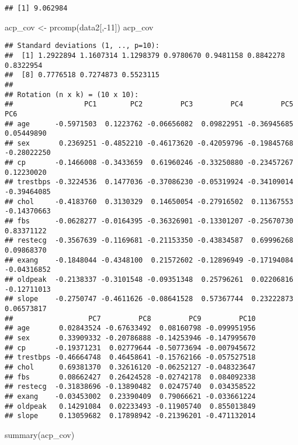 \documentclass[
]{article}
\newenvironment{Shaded}{\begin{snugshade}}{\end{snugshade}}
\newcommand{\DecValTok}[1]{\textcolor[rgb]{0.00,0.00,0.81}{#1}}
\newcommand{\FunctionTok}[1]{\textcolor[rgb]{0.00,0.00,0.00}{#1}}
\newcommand{\NormalTok}[1]{#1}
\newcommand{\OtherTok}[1]{\textcolor[rgb]{0.56,0.35,0.01}{#1}}
\newcommand{\SpecialCharTok}[1]{\textcolor[rgb]{0.00,0.00,0.00}{#1}}
\begin{document}
\begin{verbatim}
## [1] 9.062984
\end{verbatim}

\begin{Shaded}
\begin{Highlighting}[]
\NormalTok{acp\_cov }\OtherTok{\textless{}{-}} \FunctionTok{prcomp}\NormalTok{(data2[,}\SpecialCharTok{{-}}\DecValTok{11}\NormalTok{])}
\NormalTok{acp\_cov}
\end{Highlighting}
\end{Shaded}

\begin{verbatim}
## Standard deviations (1, .., p=10):
##  [1] 1.2922894 1.1607314 1.1298379 0.9780670 0.9481158 0.8842278 0.8322954
##  [8] 0.7776518 0.7274873 0.5523115
## 
## Rotation (n x k) = (10 x 10):
##                 PC1        PC2         PC3         PC4         PC5         PC6
## age      -0.5971503  0.1223762 -0.06656082  0.09822951 -0.36945685  0.05449890
## sex       0.2369251 -0.4852210 -0.46173620 -0.42059796 -0.19845768 -0.28022250
## cp       -0.1466008 -0.3433659  0.61960246 -0.33250880 -0.23457267  0.12230020
## trestbps -0.3224536  0.1477036 -0.37086230 -0.05319924 -0.34109014 -0.39464085
## chol     -0.4183760  0.3130329  0.14650054 -0.27916502  0.11367553 -0.14370663
## fbs      -0.0628277 -0.0164395 -0.36326901 -0.13301207 -0.25670730  0.83371122
## restecg  -0.3567639 -0.1169681 -0.21153350 -0.43834587  0.69996268  0.09868370
## exang    -0.1848044 -0.4348100  0.21572602 -0.12896949 -0.17194084 -0.04316852
## oldpeak  -0.2138337 -0.3101548 -0.09351348  0.25796261  0.02206816 -0.12711013
## slope    -0.2750747 -0.4611626 -0.08641528  0.57367744  0.23222873  0.06573817
##                  PC7         PC8         PC9         PC10
## age       0.02843524 -0.67633492  0.08160798 -0.099951956
## sex       0.33909332 -0.20786888 -0.14253946 -0.147995670
## cp       -0.19371231  0.02779644 -0.50773694 -0.007945672
## trestbps -0.46664748  0.46458641 -0.15762166 -0.057527518
## chol      0.69381370  0.32616120 -0.06252127 -0.048323647
## fbs       0.08662427  0.26424528 -0.02742178  0.084092338
## restecg  -0.31838696 -0.13890482  0.02475740  0.034358522
## exang    -0.03453002  0.23390409  0.79066621 -0.033661224
## oldpeak   0.14291084  0.02233493 -0.11905740  0.855013849
## slope     0.13059682  0.17898942 -0.21396201 -0.471132014
\end{verbatim}

\begin{Shaded}
\begin{Highlighting}[]
\FunctionTok{summary}\NormalTok{(acp\_cov)}
\end{Highlighting}
\end{Shaded}
\end{document}

